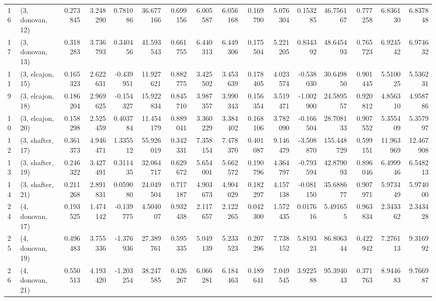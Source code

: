 \begin{tabular}{llrrrrrrrrrrrrrr}
16 &  (3, donovan, 12) &   0.273845 &  3.248290 &  0.781086 &   36.677166 &  0.699156 &   6.005587 &   6.056168 &  0.169790 &   5.076304 &  0.153285 &   46.756167 &  0.777258 &   6.836130 &   6.837848 \\
17 &  (3, donovan, 13) &   0.318283 &  3.736793 &  0.340456 &   41.593543 &  0.661755 &   6.440313 &   6.449306 &  0.175504 &   5.221205 &  0.834392 &   48.645493 &  0.765723 &   6.924542 &   6.974632 \\
11 &  (3, elcajon, 15) &   0.165323 &  2.622631 & -0.439951 &   11.927621 &  0.882775 &   3.425502 &   3.453639 &  0.178405 &   4.023574 & -0.538030 &   30.649850 &  0.901445 &   5.510025 &   5.536231 \\
9  &  (3, elcajon, 18) &   0.186204 &  2.969625 & -0.154327 &   15.922834 &  0.845710 &   3.987357 &   3.990343 &  0.156354 &   3.519471 & -1.002900 &   24.589557 &  0.920812 &   4.856310 &   4.958786 \\
10 &  (3, elcajon, 20) &   0.158298 &  2.525459 &  0.403784 &   11.454179 &  0.889041 &   3.360229 &   3.384402 &  0.168106 &   3.782090 & -0.166504 &   28.708133 &  0.907552 &   5.355409 &   5.357997 \\
12 &  (3, shafter, 17) &   0.361373 &  4.946471 &  1.335512 &   55.926019 &  0.342331 &   7.358154 &   7.478370 &  0.401087 &   9.146479 & -3.508870 &  155.448729 &  0.599151 &  11.963969 &  12.467908 \\
13 &  (3, shafter, 19) &   0.246322 &  3.427491 &  0.311435 &   32.064717 &  0.629672 &   5.654001 &   5.662572 &  0.190796 &   4.364797 & -0.793594 &   42.879093 &  0.896046 &   6.499946 &   6.548213 \\
14 &  (3, shafter, 21) &   0.211268 &  2.891831 &  0.059080 &   24.049504 &  0.717187 &   4.903673 &   4.904029 &  0.182297 &   4.157138 & -0.081150 &   35.688677 &  0.907971 &   5.973449 &   5.974000 \\
24 &  (4, donovan, 17) &   0.193525 &  1.474142 & -0.139775 &    4.504007 &  0.932438 &   2.117657 &   2.122265 &  0.042300 &   1.572435 &  0.017616 &    5.491655 &  0.963834 &   2.343362 &   2.343428 \\
25 &  (4, donovan, 19) &   0.496483 &  3.755336 & -1.376936 &   27.389761 &  0.595335 &   5.049139 &   5.233523 &  0.207296 &   7.738152 &  5.819323 &   86.806344 &  0.422942 &   7.276113 &   9.316992 \\
26 &  (4, donovan, 21) &   0.550513 &  4.193420 & -1.203254 &   38.247585 &  0.426267 &   6.066281 &   6.184463 &  0.189641 &   7.049545 &  3.922588 &   95.394043 &  0.371763 &   8.944683 &   9.766987 \\

\end{tabular}
